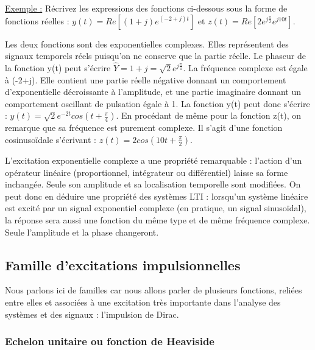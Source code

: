 	\vspace{0.5\baselineskip}
	\underline{Exemple :}
	Récrivez les expressions des fonctions ci-dessous sous la forme de fonctions réelles : $y(t)=Re[(1+j)e^{(-2+j)t}]$ et $z(t) = Re[2e^{j\frac{\pi}{2}}e^{j10t}]$.
	
	Les deux fonctions sont des exponentielles complexes. Elles représentent des signaux temporels réels puisqu'on ne conserve que la partie réelle. Le phaseur de la fonction y(t) peut s'écrire $\hat{Y}=1+j=\sqrt{2}e^{j\frac{\pi}{4}}$. La fréquence complexe est égale à (-2+j). Elle contient une partie réelle négative donnant un comportement d'exponentielle décroissante à l'amplitude, et une partie imaginaire donnant un comportement oscillant de pulsation égale à 1. La fonction y(t) peut donc s'écrire : $y(t)=\sqrt{2}e^{-2t}cos(t+\frac{\pi}{4})$.
	En procédant de même pour la fonction z(t), on remarque que sa fréquence est purement complexe. Il s'agit d'une fonction cosinusoïdale s'écrivant : $z(t)=2cos(10t+\frac{\pi}{2})$.
	
	\vspace{1\baselineskip}
	
	
	L'excitation exponentielle complexe a une propriété remarquable : l'action d'un opérateur linéaire (proportionnel, intégrateur ou différentiel) laisse sa forme inchangée. Seule son amplitude et sa localisation temporelle sont modifiées. On peut donc en déduire une propriété des systèmes LTI : lorsqu'un système linéaire est excité par un signal exponentiel complexe (en pratique, un signal sinusoïdal), la réponse sera aussi une fonction du même type et de même fréquence complexe. Seule l'amplitude et la phase changeront.
	
	
	
	\subsection{Famille d'excitations impulsionnelles}
	
	Nous parlons ici de familles car nous allons parler de plusieurs
	fonctions, reliées entre elles et associées à une excitation très importante
	dans l'analyse des systèmes et des signaux : l'impulsion de Dirac.
	
	\subsubsection{Echelon unitaire ou fonction de Heaviside}
	
